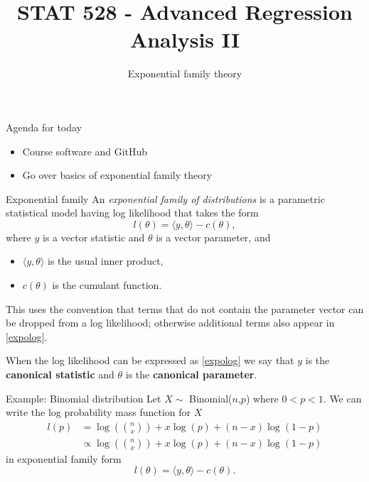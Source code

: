 \documentclass[
  ignorenonframetext,
]{beamer}
\title{STAT 528 - Advanced Regression Analysis II}
\author{Exponential family theory}
\date{}
\institute{Daniel J. Eck\\
Department of Statistics\\
University of Illinois}
\providecommand{\tightlist}{%
  \setlength{\itemsep}{0pt}\setlength{\parskip}{0pt}}
\begin{document}
\frame{\titlepage}

\begin{frame}
\newcommand{\R}{\mathbb{R}}
\newcommand{\Prob}{\mathbb{P}}
\newcommand{\Proj}{\textbf{P}}
\newcommand{\Hcal}{\mathcal{H}}
\newcommand{\rootn}{\sqrt{n}}
\newcommand{\p}{\mathbf{p}}
\newcommand{\E}{\text{E}}
\newcommand{\Var}{\text{Var}}
\newcommand{\Cov}{\text{Cov}}
\end{frame}

\begin{frame}{Agenda for today}
\protect\hypertarget{agenda-for-today}{}
\begin{itemize}
\tightlist
\item
  Course software and GitHub
\item
  Go over basics of exponential family theory
\end{itemize}
\end{frame}

\begin{frame}{Exponential family}
\protect\hypertarget{exponential-family}{}
An \emph{exponential family of distributions} is a parametric
statistical model having log likelihood that takes the form
\begin{equation} \label{expolog}
    l(\theta) = \langle y,\theta \rangle - c(\theta),
\end{equation} where \(y\) is a vector statistic and \(\theta\) is a
vector parameter, and

\begin{itemize}
\tightlist
\item
  \(\langle y,\theta \rangle\) is the usual inner product,
\item
  \(c(\theta)\) is the cumulant function.
\end{itemize}

This uses the convention that terms that do not contain the parameter
vector can be dropped from a log likelihood; otherwise additional terms
also appear in \eqref{expolog}.

When the log likelihood can be expressed as \eqref{expolog} we say that
\(y\) is the \textbf{canonical statistic} and \(\theta\) is the
\textbf{canonical parameter}.
\end{frame}

\begin{frame}{Example: Binomial distribution}
\protect\hypertarget{example-binomial-distribution}{}
Let \(X \sim\) Binomial(\(n\),\(p\)) where \(0 < p < 1\). We can write
the log probability mass function for \(X\) \begin{align*}
  l(p) &= \log\left({n \choose x}\right) +  x\log(p) + (n-x)\log(1-p) \\
       &\propto \log\left({n \choose x}\right) +  x\log(p) + (n-x)\log(1-p) 
\end{align*} in exponential family form \[
  l(\theta) = \langle y,\theta \rangle - c(\theta).
\]
\end{frame}
\end{document}
